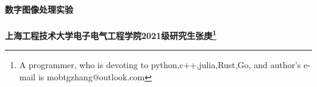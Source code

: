 \documentclass[UTF8,a4paper,10pt]{ctexart}
\begin{document}
    \begin{center}
        \LARGE\songti\textbf{数字图像处理实验} \\%
        ~\\
        \large\kaishu\textbf{上海工程技术大学\qquad 电子电气工程学院2021级研究生\qquad 张庚\footnote{A programmer, who is devoting to python,c++,julia,Rust,Go, and author's e-mail is mobtgzhang@outlook.com}}%
    \end{center}
    \begin{abstract}
        本文通过讲解数字图像处理的基本颜色模型、图像变换操作、图像增强操作以及图像滤波阐述数字图像处理重要的地位.本文讲述的主要内容包括有主要的数字图像处理中的颜色模型、颜色模型之间的转换、直方图均衡化与规定化、图像滤波、图像基本变换操作.最后通过一个具体例子来阐述数字图像处理的作用.\\
        \\
        \textbf{关键字} {\quad HSV模型 \quad HSI模型 \quad 直方图均值化\quad 直方图规定化\quad 低通滤波器\quad 高通滤波器}
    \end{abstract}
    \tableofcontents
	\thispagestyle{fancy}
    \newpage
\end{document}
